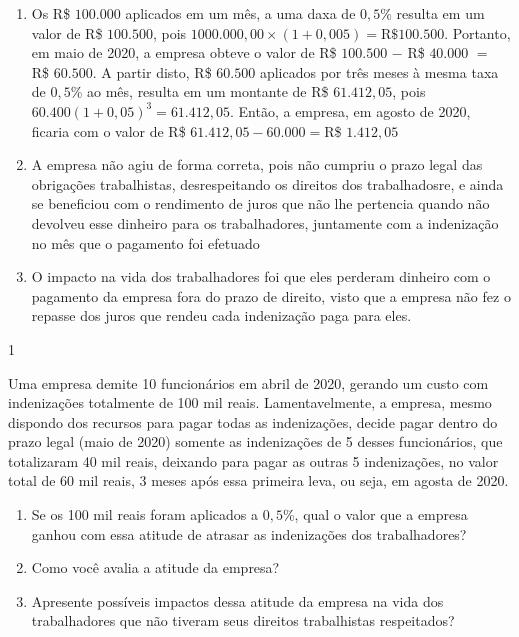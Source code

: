 \begin{resposta}{}
{
\begin{enumerate}
  \item Os R\$ $100.000$ aplicados em um mês, a uma daxa de $0{,}5$\% resulta em um valor de R\$ $100.500$, pois $1000.000{,}00\times(1+0{,}005)=\text{R\$}100.500$. Portanto, em maio de 2020, a empresa obteve o valor de R\$ $100.500$ $-$ R\$ $40.000$ $=$ R\$ $60.500$. A partir disto, R\$ $60.500$ aplicados por três meses à mesma taxa de $0{,}5$\% ao mês, resulta em um montante de R\$ $61.412{,}05$, pois $60.400(1+0{,}05)^3=61.412{,}05$. Então, a empresa, em agosto de 2020, ficaria com o valor de R\$ $61.412{,}05-60.000=$R\$ $1.412{,}05$
  \item A empresa não agiu de forma correta, pois não cumpriu o prazo legal das obrigações trabalhistas, desrespeitando os direitos dos trabalhadosre, e ainda se beneficiou com o rendimento de juros que não lhe pertencia quando não devolveu esse dinheiro para os trabalhadores, juntamente com a indenização no mês que o pagamento foi efetuado
  \item O impacto na vida dos trabalhadores foi que eles perderam dinheiro com o pagamento da empresa fora do prazo de direito, visto que a empresa não fez o repasse dos juros que rendeu cada indenização paga para eles.
\end{enumerate}
}{1}
\end{resposta}
\begin{task}{}
Uma empresa demite 10 funcionários em abril de 2020, gerando um custo com indenizações totalmente de 100 mil reais. Lamentavelmente, a empresa, mesmo dispondo dos recursos para pagar todas as indenizações, decide pagar dentro do prazo legal (maio de 2020) somente as indenizações de 5 desses funcionários, que totalizaram 40 mil reais, deixando para pagar as outras 5 indenizações, no valor total de 60 mil reais, 3 meses após essa primeira leva, ou seja, em agosta de 2020.
\begin{enumerate}
  \item Se os 100 mil reais foram aplicados a $0{,}5$\%, qual o valor que a empresa ganhou com essa atitude de atrasar as indenizações dos trabalhadores?
  \item Como você avalia a atitude da empresa?
  \item Apresente possíveis impactos dessa atitude da empresa na vida dos trabalhadores que não tiveram seus direitos trabalhistas respeitados?
\end{enumerate}
\end{task}

